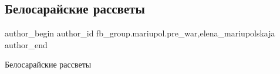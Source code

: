  
 
 
 
 

\subsection{Белосарайские рассветы}
\label{sec:06_02_2023.fb.fb_group.mariupol.pre_war.2.belosaraiskie_rassve}
 
\ifcmt
 author_begin
   author_id fb_group.mariupol.pre_war,elena_mariupolskaja
 author_end
\fi

Белосарайские рассветы

